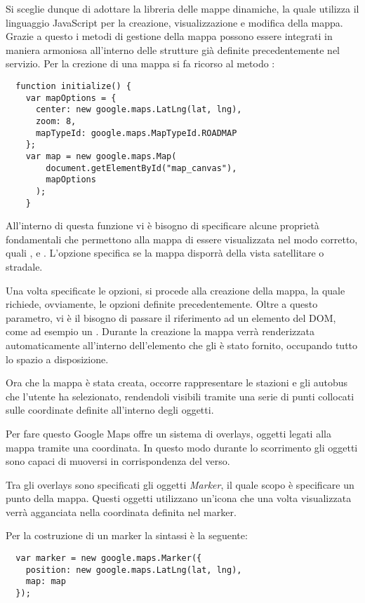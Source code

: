 Si sceglie dunque di adottare la libreria delle mappe dinamiche, la quale utilizza il linguaggio JavaScript per la creazione, visualizzazione e modifica della mappa. Grazie a questo i metodi di gestione della mappa possono essere integrati in maniera armoniosa all'interno delle strutture già definite precedentemente nel servizio.
\newpage
Per la crezione di una mappa si fa ricorso al metodo :
{\small
\begin{verbatim}
  function initialize() {
    var mapOptions = {
      center: new google.maps.LatLng(lat, lng),
      zoom: 8,
      mapTypeId: google.maps.MapTypeId.ROADMAP
    };
    var map = new google.maps.Map(
        document.getElementById("map_canvas"),
        mapOptions
      );
    }
\end{verbatim}
}
All'interno di questa funzione vi è bisogno di specificare alcune proprietà fondamentali che permettono alla mappa di essere visualizzata nel modo corretto, quali ,  e .
L'opzione  specifica se la mappa disporrà della vista satellitare o stradale.

Una volta specificate le opzioni, si procede alla creazione della mappa, la quale richiede, ovviamente, le opzioni definite precedentemente. Oltre a questo parametro, vi è il bisogno di passare il riferimento ad un elemento del DOM, come ad esempio un .
Durante la creazione la mappa verrà renderizzata automaticamente all'interno dell'elemento che gli è stato fornito, occupando tutto lo spazio a disposizione.

Ora che la mappa è stata creata, occorre rappresentare le stazioni e gli autobus che l'utente ha selezionato, rendendoli visibili tramite una serie di punti collocati sulle coordinate definite all'interno degli oggetti.

Per fare questo Google Maps offre un sistema di overlays, oggetti legati alla mappa tramite una coordinata. In questo modo durante lo scorrimento gli oggetti sono capaci di muoversi in corrispondenza del verso.

Tra gli overlays sono specificati gli oggetti {\itshape Marker}, il quale scopo è specificare un punto della mappa. Questi oggetti utilizzano un'icona che una volta visualizzata verrà agganciata nella coordinata definita nel marker.

Per la costruzione di un marker la sintassi è la seguente:

\begin{verbatim}
  var marker = new google.maps.Marker({
    position: new google.maps.LatLng(lat, lng),
    map: map
  });
\end{verbatim}

